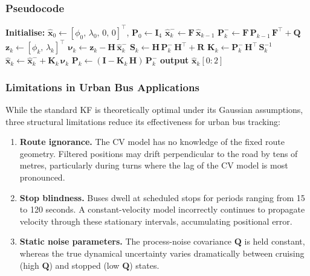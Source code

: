 \documentclass[12pt, a4paper]{article}
\begin{document}
\subsubsection{Pseudocode}

\begin{algorithm}[H]
\caption{Standard Kalman Filter for GPS Tracking}
\label{alg:standard_kf}
\begin{algorithmic}[1]
\State \textbf{Initialise:} $\hat{\mathbf{x}}_0 \leftarrow [\phi_0,\,\lambda_0,\,0,\,0]^\top$,\;
       $\mathbf{P}_0 \leftarrow \mathbf{I}_4$
    \State {}
    \State $\hat{\mathbf{x}}^-_k \leftarrow \mathbf{F}\,\hat{\mathbf{x}}_{k-1}$
    \State $\mathbf{P}^-_k \leftarrow \mathbf{F}\,\mathbf{P}_{k-1}\,\mathbf{F}^\top + \mathbf{Q}$
    \State {}
    \State $\mathbf{z}_k \leftarrow [\phi_k,\,\lambda_k]^\top$
    \State $\boldsymbol{\nu}_k \leftarrow \mathbf{z}_k - \mathbf{H}\,\hat{\mathbf{x}}^-_k$
    \State $\mathbf{S}_k \leftarrow \mathbf{H}\,\mathbf{P}^-_k\,\mathbf{H}^\top + \mathbf{R}$
    \State $\mathbf{K}_k \leftarrow \mathbf{P}^-_k\,\mathbf{H}^\top\,\mathbf{S}_k^{-1}$
    \State $\hat{\mathbf{x}}_k \leftarrow \hat{\mathbf{x}}^-_k + \mathbf{K}_k\,\boldsymbol{\nu}_k$
    \State $\mathbf{P}_k \leftarrow (\mathbf{I} - \mathbf{K}_k\,\mathbf{H})\,\mathbf{P}^-_k$
    \State \textbf{output} $\hat{\mathbf{x}}_k[0:2]$ 
\EndFor
\end{algorithmic}
\end{algorithm}

\subsubsection{Limitations in Urban Bus Applications}

While the standard KF is theoretically optimal under its Gaussian assumptions,
three structural limitations reduce its effectiveness for urban bus tracking:

\begin{enumerate}
    \item \textbf{Route ignorance.} The CV model has no knowledge of the fixed
          route geometry. Filtered positions may drift perpendicular to the road
          by tens of metres, particularly during turns where the lag of the CV
          model is most pronounced.

    \item \textbf{Stop blindness.} Buses dwell at scheduled stops for periods
          ranging from 15 to 120 seconds. A constant-velocity model incorrectly
          continues to propagate velocity through these stationary intervals,
          accumulating positional error.

    \item \textbf{Static noise parameters.} The process-noise covariance
          $\mathbf{Q}$ is held constant, whereas the true dynamical uncertainty
          varies dramatically between cruising (high $\mathbf{Q}$) and stopped
          (low $\mathbf{Q}$) states.
\end{enumerate}
\end{document}
